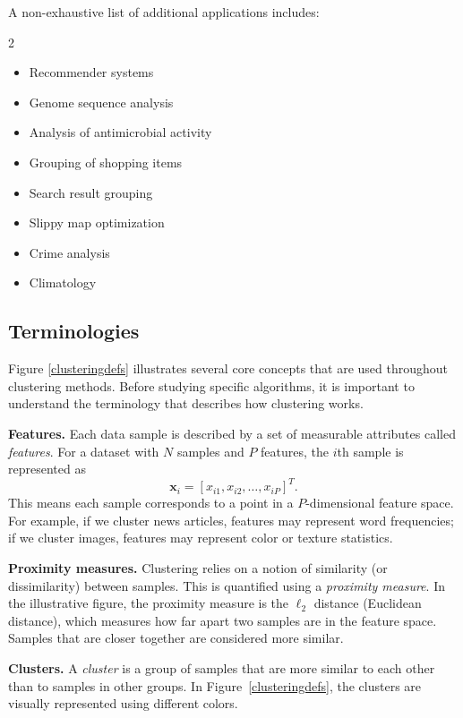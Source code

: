 \documentclass{article}
\begin{document}
A non-exhaustive list of additional applications includes:
\begin{multicols}{2}
\begin{itemize}
    \item Recommender systems
    \item Genome sequence analysis
    \item Analysis of antimicrobial activity
    \item Grouping of shopping items
    \item Search result grouping
    \item Slippy map optimization
    \item Crime analysis
    \item Climatology
\end{itemize}
\end{multicols}

\subsection{Terminologies}

Figure \ref{clusteringdefs} illustrates several core concepts that are used 
throughout clustering methods. Before studying specific algorithms, it is 
important to understand the terminology that describes how clustering works.

\medskip
\noindent\textbf{Features.}  
Each data sample is described by a set of measurable attributes called 
\textit{features}. For a dataset with $N$ samples and $P$ features, the 
$i$th sample is represented as
\[
\mathbf{x}_i = [x_{i1}, x_{i2}, \ldots, x_{iP}]^T .
\]
This means each sample corresponds to a point in a $P$-dimensional feature 
space. For example, if we cluster news articles, features may represent 
word frequencies; if we cluster images, features may represent color or 
texture statistics.

\medskip
\noindent\textbf{Proximity measures.}  
Clustering relies on a notion of similarity (or dissimilarity) between 
samples. This is quantified using a \textit{proximity measure}. In the 
illustrative figure, the proximity measure is the $\ell_2$ distance 
(Euclidean distance), which measures how far apart two samples are in the 
feature space. Samples that are closer together are considered more similar.

\medskip
\noindent\textbf{Clusters.}  
A \textit{cluster} is a group of samples that are more similar to each other 
than to samples in other groups. In Figure~\ref{clusteringdefs}, the clusters 
are visually represented using different colors.
\end{document}
